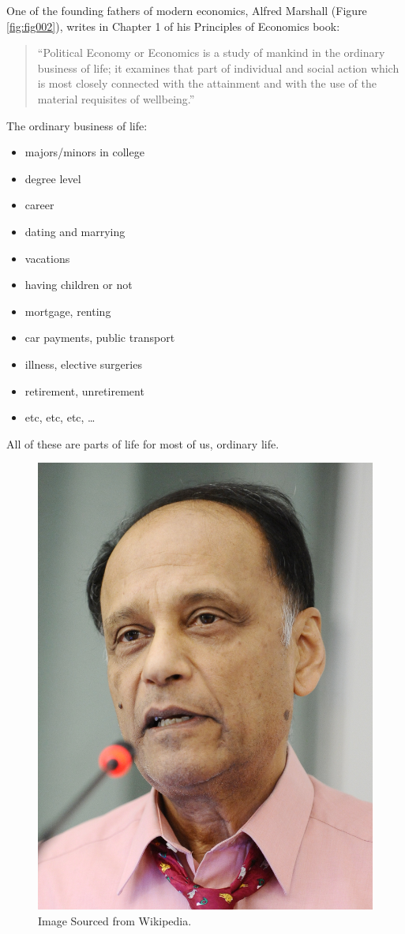 \documentclass[
]{book}
\providecommand{\tightlist}{%
  \setlength{\itemsep}{0pt}\setlength{\parskip}{0pt}}
\begin{document}
One of the founding fathers of modern economics, Alfred Marshall (Figure \ref{fig:fig002}), writes in Chapter 1 of his Principles of Economics book:

\begin{quote}
``Political Economy or Economics is a study of mankind in the ordinary business of life; it examines that part of individual and social action which is most closely connected with the attainment and with the use of the material requisites of wellbeing.''
\end{quote}

The ordinary business of life:

\begin{itemize}
\tightlist
\item
  majors/minors in college
\item
  degree level
\item
  career
\item
  dating and marrying
\item
  vacations
\item
  having children or not
\item
  mortgage, renting
\item
  car payments, public transport
\item
  illness, elective surgeries
\item
  retirement, unretirement
\item
  etc, etc, etc, \ldots{}
\end{itemize}

All of these are parts of life for most of us, ordinary life.

\begin{figure}

{\centering \includegraphics[width=0.5\linewidth]{img/ch0/Partha_Dasgupta} 

}

\caption{Image Sourced from Wikipedia.}\label{fig:fig003}
\end{figure}
\end{document}
